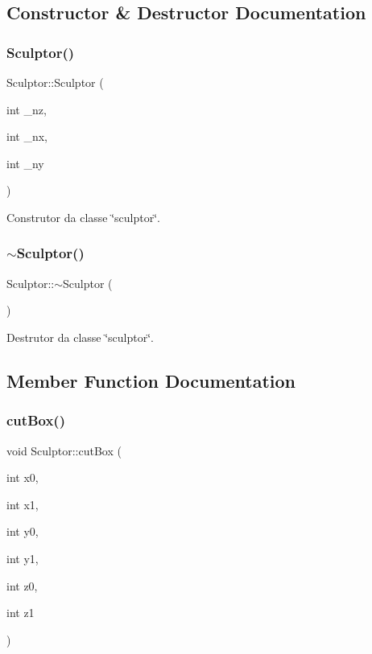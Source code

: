\subsection{Constructor \& Destructor Documentation}
\mbox{\label{classSculptor_a014e3ef5517bf0e9d9e14486b6ac6433}} 
\subsubsection{\texorpdfstring{Sculptor()}{Sculptor()}}
{\footnotesize\ttfamily Sculptor\+::\+Sculptor (\begin{DoxyParamCaption}\item[{int}]{\+\_\+nz,  }\item[{int}]{\+\_\+nx,  }\item[{int}]{\+\_\+ny }\end{DoxyParamCaption})}

Construtor da classe \char`\"{}sculptor\char`\"{}. \mbox{\label{classSculptor_a8f159bf97458326f16d2e238e11be7ff}} 
\subsubsection{\texorpdfstring{$\sim$Sculptor()}{~Sculptor()}}
{\footnotesize\ttfamily Sculptor\+::$\sim$\+Sculptor (\begin{DoxyParamCaption}{ }\end{DoxyParamCaption})}

Destrutor da classe \char`\"{}sculptor\char`\"{}. 

\subsection{Member Function Documentation}
\mbox{\label{classSculptor_aa84a1b12b09e9e103fc8d78f8d1bc00f}} 
\subsubsection{\texorpdfstring{cutBox()}{cutBox()}}
{\footnotesize\ttfamily void Sculptor\+::cut\+Box (\begin{DoxyParamCaption}\item[{int}]{x0,  }\item[{int}]{x1,  }\item[{int}]{y0,  }\item[{int}]{y1,  }\item[{int}]{z0,  }\item[{int}]{z1 }\end{DoxyParamCaption})}

